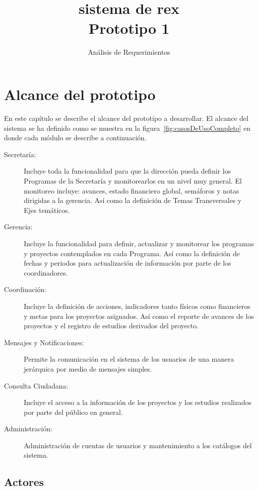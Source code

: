\documentclass[10pt]{book}
\title{\Sistema \\\LARGE{sistema de rex \\{\bf Prototipo 1}}}
\subtitle{Análisis de Requerimientos}
\begin{document}
\maketitle\thispagestyle{empty}

\frontmatter
\tableofcontents

\mainmatter


\chapter{Alcance del prototipo}

	En este capítulo se describe el alcance del prototipo a desarrollar. El alcance del sistema se ha definido como se muestra en la figura~\ref{fig:casosDeUsoCompleto} en donde cada módulo se describe a continuación.



\begin{description}
	\item[Secretaría:] Incluye toda la funcionalidad para que la dirección pueda definir los Programas de la Secretaría y monitorearlos en un nivel muy general. El monitoreo incluye: avances, estado financiero global, semáforos y notas dirigidas a la gerencia. Así como la definición de Temas Transversales y Ejes temáticos.
	\item[Gerencia:] Incluye la funcionalidad para definir, actualizar y monitorear los programas y proyectos contemplados en cada Programa. Así como la definición de fechas y periodos para actualización de información por parte de los coordinadores.
	\item[Coordinación:] Incluye la definición de acciones, indicadores tanto físicos como financieros y metas para los proyectos asignados. Así como el reporte de avances de los proyectos y el registro de estudios derivados del proyecto.
	\item[Mensajes y Notificaciones:] Permite la comunicación en el sistema de los usuarios de una manera jerárquica por medio de mensajes simples.
	\item[Consulta Ciudadana:] Incluye el acceso a la información de los proyectos y los estudios realizados por parte del público en general.
	\item[Administración:] Administración de cuentas de usuarios y mantenimiento a los catálogos del sistema.
\end{description}

\section{Actores}
\end{document}
